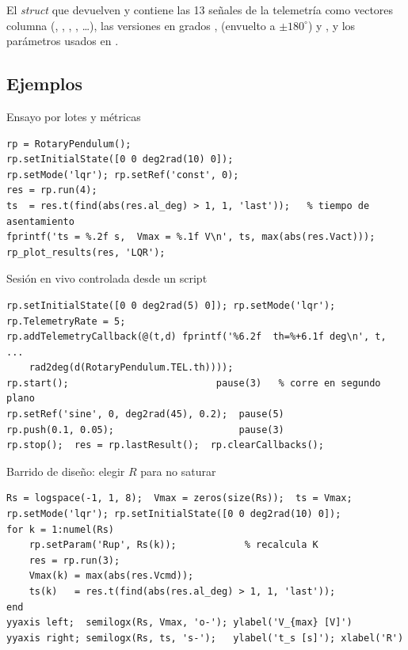 El \emph{struct} que devuelven  y  contiene las 13 señales de la telemetría como vectores columna (, , , , \ldots), las versiones en grados ,  (envuelto a $\pm180^\circ$) y , y los parámetros usados en .

\subsection{Ejemplos}

\begin{ejemplo}{Ensayo por lotes y métricas}
\begin{lstlisting}
rp = RotaryPendulum();
rp.setInitialState([0 0 deg2rad(10) 0]);
rp.setMode('lqr'); rp.setRef('const', 0);
res = rp.run(4);
ts  = res.t(find(abs(res.al_deg) > 1, 1, 'last'));   % tiempo de asentamiento
fprintf('ts = %.2f s,  Vmax = %.1f V\n', ts, max(abs(res.Vact)));
rp_plot_results(res, 'LQR');
\end{lstlisting}
\end{ejemplo}

\begin{ejemplo}{Sesión en vivo controlada desde un script}
\begin{lstlisting}
rp.setInitialState([0 0 deg2rad(5) 0]); rp.setMode('lqr');
rp.TelemetryRate = 5;
rp.addTelemetryCallback(@(t,d) fprintf('%6.2f  th=%+6.1f deg\n', t, ...
    rad2deg(d(RotaryPendulum.TEL.th))));
rp.start();                          pause(3)   % corre en segundo plano
rp.setRef('sine', 0, deg2rad(45), 0.2);  pause(5)
rp.push(0.1, 0.05);                      pause(3)
rp.stop();  res = rp.lastResult();  rp.clearCallbacks();
\end{lstlisting}
\end{ejemplo}

\begin{ejemplo}{Barrido de diseño: elegir $R$ para no saturar}
\begin{lstlisting}
Rs = logspace(-1, 1, 8);  Vmax = zeros(size(Rs));  ts = Vmax;
rp.setMode('lqr'); rp.setInitialState([0 0 deg2rad(10) 0]);
for k = 1:numel(Rs)
    rp.setParam('Rup', Rs(k));            % recalcula K
    res = rp.run(3);
    Vmax(k) = max(abs(res.Vcmd));
    ts(k)   = res.t(find(abs(res.al_deg) > 1, 1, 'last'));
end
yyaxis left;  semilogx(Rs, Vmax, 'o-'); ylabel('V_{max} [V]')
yyaxis right; semilogx(Rs, ts, 's-');   ylabel('t_s [s]'); xlabel('R')
\end{lstlisting}
\end{ejemplo}

